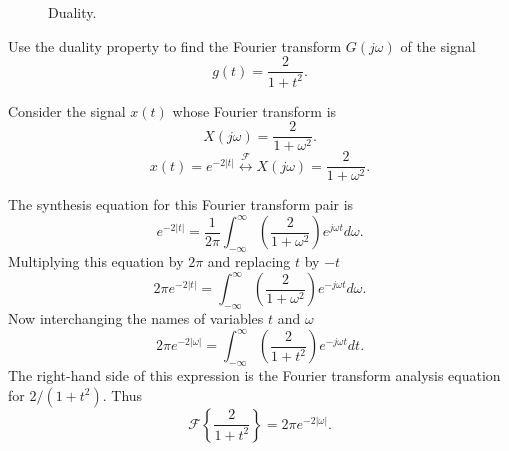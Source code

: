 \begin{frame}[plain]
{
        \begin{figure}
          \centering
          
          \caption{Duality.}\label{fi:diality}
        \end{figure}
}
\end{frame}


\begin{frame}[plain]
    \begin{example}
        Use the duality property to find the Fourier transform $G(j\omega)$ of the signal
        \begin{equation*}
            g(t) = \frac{2}{1+t^2}.
        \end{equation*}
    \end{example}
    \pause
    {
    Consider the signal $x(t)$ whose Fourier transform is
    \begin{equation*}
        X(j\omega) =  \frac{2}{1+\omega^2}.
    \end{equation*}
    \begin{equation*}
        x(t) = e^{-2|t|} \overset{\mathcal{F}}{\longleftrightarrow}  X(j\omega) =  \frac{2}{1+\omega^2}.
    \end{equation*}
    }
\end{frame}


\begin{frame}[plain]
    {
    The synthesis equation for this Fourier transform pair is \pause
    \begin{equation*}
        e^{-2|t|} = \frac{1}{2\pi}\int_{-\infty}^{\infty}\left(\frac{2}{1+\omega^2}\right)e^{j\omega t}d\omega.
    \end{equation*}
    \pause
    Multiplying this equation by $2\pi$ and replacing $t$ by $-t$\pause
    \begin{equation*}
        2\pi e^{-2|t|} = \int_{-\infty}^{\infty}\left(\frac{2}{1+\omega^2}\right)e^{-j\omega t}d\omega.
    \end{equation*}
    \pause
    Now interchanging the names of variables $t$ and $\omega$\pause
    \begin{equation*}
        2\pi e^{-2|\omega|} = \int_{-\infty}^{\infty}\left(\frac{2}{1+t^2}\right)e^{-j\omega t}dt.
    \end{equation*}
    \pause
    The right-hand side of this expression is the Fourier transform analysis equation for $2/(1+t^2)$.   Thus
    \begin{equation*}
        \mathcal{F}\left\{ \frac{2}{1+t^2}\right\} =  2\pi e^{-2|\omega|}.
    \end{equation*}
    }
\end{frame}


